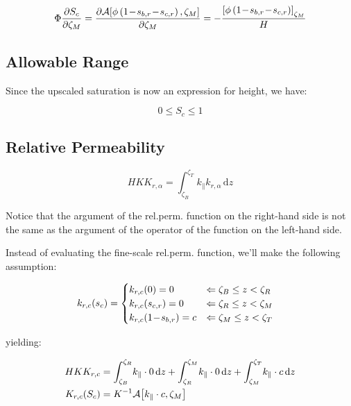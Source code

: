 \documentclass[12pt]{scrartcl}
\newcommand{\aleft}{\mathopen{}\mathclose\bgroup\left}  %
\newcommand{\aright}{\aftergroup\egroup\right}          %
\newcommand{\binop}[3]{#1\mkern1mu{#2}\mkern1mu #3}     %
\newcommand{\dual}[1]{\binop{1}{-}{#1}}                 %
\newcommand{\ddual}[2]{\binop{\binop{1}{-}{#1}}{-}{#2}} %
\newcommand{\at}[2]{\left[ #1 \right]_{#2}}             %
\newcommand{\der}[2]{\frac{\partial{#1}}{\partial{#2}}}       %
\newcommand{\intg}[4]{\int_{#1}^{#2}\!{#3}\,\mathrm{d}{#4}}   %
\newcommand{\inv}[1]{{#1}^{-1}}                               %
\newcommand{\latr}[1]{{#1}_{\|}}                              %
\newcommand{\Hei}{H}        %
\newcommand{\Por}{\Phi}     %
\newcommand{\por}{\phi}     %
\newcommand{\Sat}{S}        %
\newcommand{\sat}{s}        %
\newcommand{\sr}[1]{\sat_{#1,r}}    %
\newcommand{\Prm}{K}        %
\newcommand{\prm}{k}        %
\newcommand{\Rlp}[1]{K_{r,#1}}  %
\newcommand{\rlp}[1]{k_{r,#1}}  %
\newcommand{\phs}{\alpha}   %
\newcommand{\Lev}{\zeta}    %
\newcommand{\Top}{T}        %
\newcommand{\Bot}{B}        %
\newcommand{\Res}{R}        %
\newcommand{\Mob}{M}        %
\newcommand{\dph}{z}        %
\newcommand{\nap}{c}        %
\newcommand{\wet}{b}        %
\newcommand{\avg}[2]{\mathcal{A}\aleft[#1, #2\aright]}  %
\newcommand{\krnwr}{c}      %
\newcommand{\Satn}{\Sat_\nap}
\newcommand{\satn}{\sat_\nap}
\newcommand{\snr}{\sr{\nap}}    %
\newcommand{\swr}{\sr{\wet}}    %
\newcommand{\LevT}{\Lev_\Top}
\newcommand{\LevB}{\Lev_\Bot}
\newcommand{\LevM}{\Lev_\Mob}
\newcommand{\LevR}{\Lev_\Res}
\newcommand{\Rlpp}{\Rlp{\phs}}  %
\newcommand{\rlpp}{\rlp{\phs}}
\newcommand{\Rlpn}{\Rlp{\nap}}  %
\newcommand{\rlpn}{\rlp{\nap}}
\newcommand{\Absprm}{\Prm}          %
\newcommand{\absprm}{\latr{\prm}}   %
\begin{document}
\begin{equation}
\Por \der{ \Satn }{ \LevM } = \der{ \avg{ \por \left( \ddual{ \swr }{ \snr } \right) }{ \LevM } }{ \LevM } = - \frac{ \at{ \por \left( \ddual{ \swr }{ \snr } \right) }{ \LevM } }{ \Hei }
\end{equation}

\subsection{Allowable Range}

Since the upscaled saturation is now an expression for height, we have:

\begin{equation}
0 \leq \Satn \leq 1
\end{equation}

\subsection{Relative Permeability}
\begin{equation}
\Hei \Prm \Rlpp = \intg{ \LevB }{ \LevT }{ \latr{ \prm } \rlpp }{ \dph }
\end{equation}

Notice that the argument of the rel.perm. function on the right-hand side is not the same as the argument of the operator of the function on the left-hand side.

Instead of evaluating the fine-scale rel.perm. function, we'll make the following assumption:

\begin{align}
\rlpn \aleft( \satn \aright) &=
\begin{cases}
\rlpn \aleft( 0 \aright) = 0 & \Leftarrow \LevB \leq \dph < \LevR \\
\rlpn \aleft( \snr \aright) = 0 & \Leftarrow \LevR \leq \dph < \LevM \\
\rlpn \aleft( \dual{\swr} \aright) = \krnwr & \Leftarrow \LevM \leq \dph < \LevT
\end{cases}
\end{align}

yielding:

\begin{align}
\Hei \Absprm \Rlpn &= \intg{ \LevB }{ \LevR }{ \absprm \cdot 0 }{ \dph } + \intg{ \LevR }{ \LevM }{ \absprm \cdot 0 }{ \dph } + \intg{ \LevM }{ \LevT }{ \absprm \cdot \krnwr }{ \dph } \\
\Rlpn \aleft( \Satn \aright) &= \inv{ \Absprm } \avg{ \absprm \cdot \krnwr }{ \LevM }
\end{align}
\end{document}
